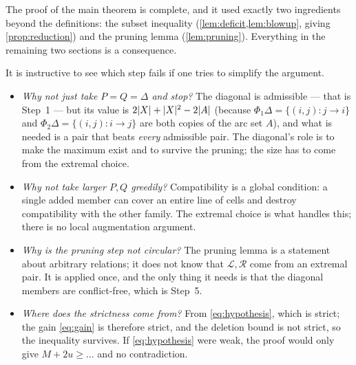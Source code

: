 \begin{checkpoint}
The proof of the main theorem is complete, and it used exactly two ingredients beyond the definitions:
the subset inequality (\cref{lem:deficit,lem:blowup}, giving \cref{prop:reduction}) and the pruning
lemma (\cref{lem:pruning}). Everything in the remaining two sections is a consequence.
\end{checkpoint}

\begin{remark}\label{rem:why-hard}
It is instructive to see which step fails if one tries to simplify the argument.
\begin{itemize}[leftmargin=1.4em,itemsep=2pt,topsep=1pt]
\item \emph{Why not just take $P=Q=\Delta$ and stop?} The diagonal is admissible --- that is Step~1
  --- but its value is $2\lvert X\rvert+\lvert X\rvert^2-2\lvert A\rvert$ (because $\Phi_1\Delta=\{(i,j):j\to i\}$ and
  $\Phi_2\Delta=\{(i,j):i\to j\}$ are both copies of the arc set $A$), and what is needed is a pair
  that beats \emph{every} admissible pair. The diagonal's role is to make the maximum exist and to
  survive the pruning; the size has to come from the extremal choice.
\item \emph{Why not take larger $P,Q$ greedily?} Compatibility is a global condition: a single added
  member can cover an entire line of cells and destroy compatibility with the other family. The
  extremal choice is what handles this; there is no local augmentation argument.
\item \emph{Why is the pruning step not circular?} The pruning lemma is a statement about arbitrary
  relations; it does not know that $\mathcal L,\mathcal R$ come from an extremal pair. It is applied
  once, and the only thing it needs is that the diagonal members are conflict-free, which is Step~5.
\item \emph{Where does the strictness come from?} From \eqref{eq:hypothesis}, which is strict; the
  gain \eqref{eq:gain} is therefore strict, and the deletion bound is not strict, so the inequality
  survives. If \eqref{eq:hypothesis} were weak, the proof would only give $M+2u\ge\ldots$ and no
  contradiction.
\end{itemize}
\end{remark}
